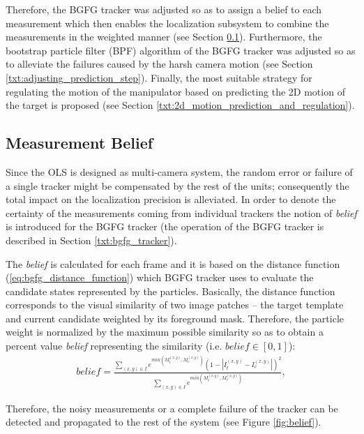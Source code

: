 Therefore, the BGFG tracker was adjusted so as to assign a belief to each measurement which then enables the localization subsystem to combine the measurements in the weighted manner (see Section \ref{txt:measurement_belief}). Furthermore, the bootstrap particle filter (BPF) algorithm of the BGFG tracker was adjusted so as to alleviate the failures caused by the harsh camera motion (see Section \ref{txt:adjusting_prediction_step}). Finally, the most suitable strategy for regulating the motion of the manipulator based on predicting the 2D motion of the target is proposed (see Section \ref{txt:2d_motion_prediction_and_regulation}).

\subsection{Measurement Belief} \label{txt:measurement_belief}

Since the OLS is designed as multi-camera system, the random error or failure of a single tracker might be compensated by the rest of the units; consequently the total impact on the localization precision is alleviated. In order to denote the certainty of the measurements coming from individual trackers the notion of \textit{belief} is introduced for the BGFG tracker (the operation of the BGFG tracker is described in Section \ref{txt:bgfg_tracker}).

The \textit{belief} is calculated for each frame and it is based on the distance function (\ref{eq:bgfg_distance_function}) which BGFG tracker uses to evaluate the candidate states represented by the particles. Basically, the distance function corresponds to the visual similarity of two image patches -- the target template and current candidate weighted by its foreground mask. Therefore, the particle weight is normalized by the maximum possible similarity so as to obtain a percent value \textit{belief} representing the similarity (i.e. $\textit{belief} \in [0, 1]$):
\begin{align}
	belief = \frac{\sum_{(x,y) \in I}{e^{min(M_{t}^{(x,y)}, M_{c}^{(x,y)})}(1 - |I_{t}^{(x,y)} - I_{c}^{(x,y)}|)^{2}}}{\sum_{(x,y) \in I}{e^{min(M_{t}^{(x,y)}, M_{c}^{(x,y)})}}},
\end{align}

Therefore, the noisy measurements or a complete failure of the tracker can be detected and propagated to the rest of the system (see Figure \ref{fig:belief}).

